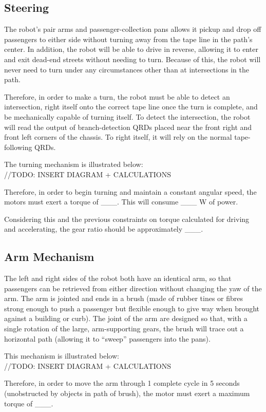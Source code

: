 \documentclass[12pt]{article}
\begin{document}
\subsection{Steering}
\par The robot’s pair arms and passenger-collection pans allows it pickup and drop off passengers to either side without turning away from the tape line in the path’s center. In addition, the robot will be able to drive in reverse, allowing it to enter and exit dead-end streets without needing to turn. Because of this, the robot will never need to turn under any circumstances other than at intersections in the path. \\ \par 
Therefore, in order to make a turn, the robot must be able to detect an intersection, right itself onto the correct tape line once the turn is complete, and be mechanically capable of turning itself. To detect the intersection, the robot will read the output of branch-detection QRDs placed near the front right and front left corners of the chassis. To right itself, it will rely on the normal tape-following QRDs. \\ \par 
The turning mechanism is illustrated below: \\
//TODO: INSERT DIAGRAM + CALCULATIONS \\
\par Therefore, in order to begin turning and maintain a constant angular speed,  the motors must exert a torque of \_\_\_. This will consume \_\_\_ W of power. \\ \par 
Considering this and the previous constraints on torque calculated for driving and accelerating, the gear ratio should be approximately \_\_\_. \\
\subsection{Arm Mechanism}
\par The left and right sides of the robot both have an identical arm, so that passengers can be retrieved from either direction without changing the yaw of the arm. The arm is jointed and ends in a brush (made of rubber tines or fibres strong enough to push a passenger but flexible enough to give way when brought against a building or curb). The joint of the arm are designed so that, with a single rotation of the large, arm-supporting gears, the brush will trace out a horizontal path (allowing it to “sweep” passengers into the pans). \\ \par 
\par This mechanism is illustrated below: \\
//TODO: INSERT DIAGRAM + CALCULATIONS \\
\par Therefore, in order to move the arm through 1 complete cycle in 5 seconds (unobstructed by objects in path of brush), the motor must exert a maximum torque of \_\_\_.
\end{document}
